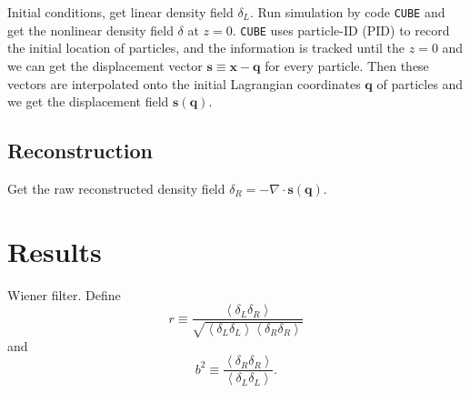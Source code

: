 \documentclass[aps,prd,twocolumn,superscriptaddress,amsfont,amssymb,amsmath,nofootinbib,showpacs,balancelastpage]{revtex4-1}
\newcommand{\bs}{\boldsymbol}
\begin{document}
Initial conditions, get linear density field $\delta_L$. Run simulation by code {\tt CUBE} and get the nonlinear density field $\delta$ at $z=0$. {\tt CUBE} uses particle-ID (PID) to record the initial location of particles, and the information is tracked until the $z=0$ and we can get the displacement vector ${\bs s}\equiv{\bs x}-{\bs q}$ for every particle. Then these vectors are interpolated onto the initial Lagrangian coordinates ${\bs q}$ of particles and we get the displacement field ${\bs s}({\bs q})$.

\subsection{Reconstruction}
Get the raw reconstructed density field $\delta_R=-\nabla\cdot{\bs s}({\bs q})$.



\section{Results}\label{sec.results}

Wiener filter.
Define
\begin{equation}
    r\equiv \frac{\left\langle\delta_L\delta_R\right\rangle}
    {\sqrt{\left\langle\delta_L\delta_L\right\rangle
    \left\langle\delta_R\delta_R\right\rangle}}
\end{equation}
and
\begin{equation}
    b^2\equiv \frac{\left\langle\delta_R\delta_R\right\rangle}
    {\left\langle\delta_L\delta_L\right\rangle}.
\end{equation}
\end{document}
